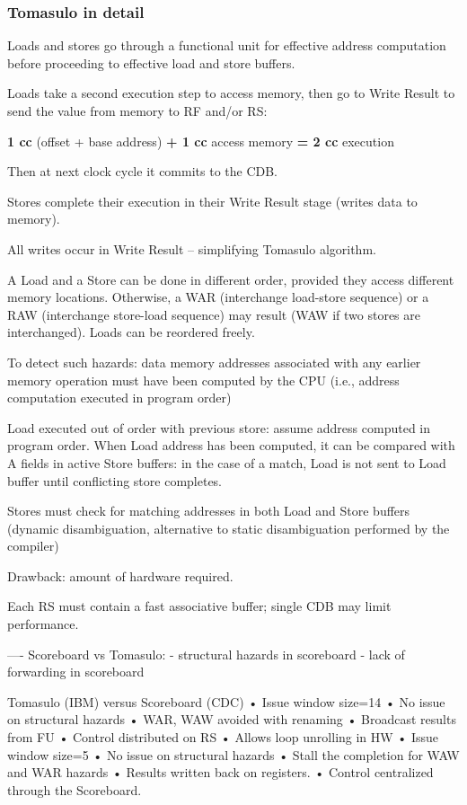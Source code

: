 \subsubsection{Tomasulo in detail}
Loads and stores go through a functional unit
for effective address computation before
proceeding to effective load and store buffers.

Loads take a second execution step to access
memory, then go to Write Result to send the
value from memory to RF and/or RS:
\begin{center}
    \textbf{1 cc} (offset + base address) \textbf{+ 1 cc} access memory \textbf{= 2 cc}
    execution
\end{center}
Then at next clock cycle it commits to the CDB\@.

Stores complete their execution in their Write
Result stage (writes data to memory).

All writes occur in Write Result – simplifying
Tomasulo algorithm.

A Load and a Store can be done in different
order, provided they access different memory
locations.
Otherwise, a WAR (interchange load-store
sequence) or a RAW (interchange store-load
sequence) may result (WAW if two stores are
interchanged).
Loads can be reordered freely.

To detect such hazards: data memory
addresses associated with any earlier memory
operation must have been computed by the
CPU (i.e., address computation executed in
program order)

Load executed out of order with previous store:
assume address computed in program order.
When Load address has been computed, it
can be compared with A fields in active Store
buffers: in the case of a match, Load is not sent
to Load buffer until conflicting store completes.

Stores must check for matching addresses in
both Load and Store buffers (dynamic
disambiguation, alternative to static
disambiguation performed by the compiler)

Drawback: amount of hardware required.

Each RS must contain a fast associative buffer;
single CDB may limit performance.



----
Scoreboard vs Tomasulo:
- structural hazards in scoreboard
- lack of forwarding in scoreboard

Tomasulo (IBM) versus Scoreboard (CDC)
• Issue window size=14
• No issue on structural
hazards
• WAR, WAW avoided with
renaming
• Broadcast results from FU
• Control distributed on RS
• Allows loop unrolling in
HW
• Issue window size=5
• No issue on structural
hazards
• Stall the completion for
WAW and WAR hazards
• Results written back on
registers.
• Control centralized
through the Scoreboard.


